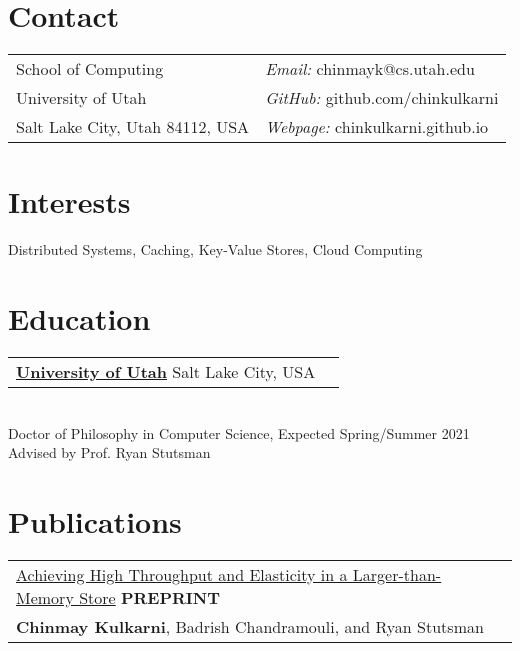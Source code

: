 \documentclass[margin,line]{res}
\begin{document}
\name{Chinmay Kulkarni\newline %
      {\small PhD Student, University of Utah}}
\begin{resume}
\section{\sc Contact}
 \begin{tabular}{@{}p{3.25in}p{4in}}
 School of Computing                             & {\it Email:  }  chinmayk@cs.utah.edu \\
 University of Utah                              & {\it GitHub:}   github.com/chinkulkarni \\
 Salt Lake City, Utah 84112, USA                 & {\it Webpage:}  chinkulkarni.github.io \\
 \end{tabular}

\section{\sc Interests}
Distributed Systems, Caching, Key-Value Stores, Cloud Computing

\section{\sc Education}
 \begin{tabular}{@{}p{5.5in}p{4in}}
  {\bf \href{http://www.cs.utah.edu/}{University of Utah}} \dotfill Salt Lake City,
  USA
 \end{tabular}
 \\ {\small Doctor of Philosophy in Computer Science, Expected Spring/Summer 2021}
 \\ {\small Advised by Prof. Ryan Stutsman}

\section{\sc Publications}
 \vspace{-2.5pt}
 \begin{tabular}{@{}p{5.5in}p{4in}}
 \href{https://arxiv.org/abs/2006.03206}{Achieving High Throughput and
 Elasticity in a Larger-than-Memory Store} \hfill
 {\small\bf PREPRINT}\\
 {\small {\bf Chinmay Kulkarni}, Badrish Chandramouli, and Ryan Stutsman}\\
 \end{tabular}


\end{resume}
\end{document}
